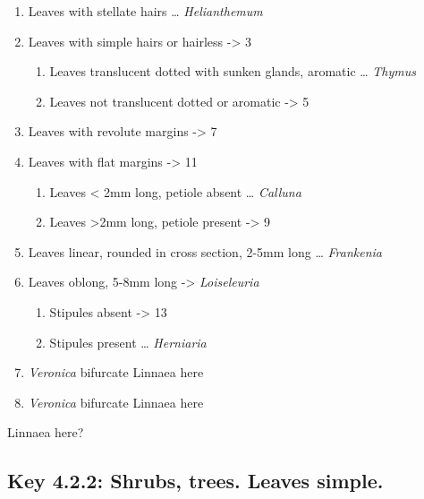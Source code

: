 \documentclass[openany]{book}
\providecommand{\tightlist}{%
  \setlength{\itemsep}{0pt}\setlength{\parskip}{0pt}}
\begin{document}
\begin{enumerate}
\def\labelenumi{\arabic{enumi}.}
\tightlist
\item
  Leaves with stellate hairs \ldots{} \emph{Helianthemum}
\item
  Leaves with simple hairs or hairless -\textgreater{} 3

  \begin{enumerate}
  \def\labelenumii{\arabic{enumii}.}
  \setcounter{enumii}{2}
  \tightlist
  \item
    Leaves translucent dotted with sunken glands, aromatic \ldots{}
    \emph{Thymus}
  \item
    Leaves not translucent dotted or aromatic -\textgreater{} 5
  \end{enumerate}
\item
  Leaves with revolute margins -\textgreater{} 7
\item
  Leaves with flat margins -\textgreater{} 11

  \begin{enumerate}
  \def\labelenumii{\arabic{enumii}.}
  \setcounter{enumii}{6}
  \tightlist
  \item
    Leaves \textless{} 2mm long, petiole absent \ldots{} \emph{Calluna}
  \item
    Leaves \textgreater{}2mm long, petiole present -\textgreater{} 9
  \end{enumerate}
\item
  Leaves linear, rounded in cross section, 2-5mm long \ldots{}
  \emph{Frankenia}
\item
  Leaves oblong, 5-8mm long -\textgreater{} \emph{Loiseleuria}

  \begin{enumerate}
  \def\labelenumii{\arabic{enumii}.}
  \setcounter{enumii}{10}
  \tightlist
  \item
    Stipules absent -\textgreater{} 13
  \item
    Stipules present \ldots{} \emph{Herniaria}
  \end{enumerate}
\item
  \emph{Veronica} bifurcate Linnaea here
\item
  \emph{Veronica} bifurcate Linnaea here
\end{enumerate}

Linnaea here?

\hypertarget{key-4.2.2-shrubs-trees.-leaves-simple.}{%
\subsection{Key 4.2.2: Shrubs, trees. Leaves
simple.}\label{key-4.2.2-shrubs-trees.-leaves-simple.}}
\end{document}
